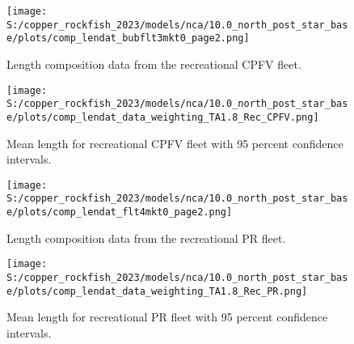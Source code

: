 \documentclass[11pt,
  letterpaper,
]{article}
\begin{document}
\pagebreak

\begin{figure}
{\centering
\texttt{[image: S:/copper\_rockfish\_2023/models/nca/10.0\_north\_post\_star\_base/plots/comp\_lendat\_bubflt3mkt0\_page2.png]}
}
\caption{Length composition data from the recreational CPFV fleet.\label{fig:rec-cpfv-len-data}}
\end{figure}

\pagebreak

\begin{figure}
{\centering
\texttt{[image: S:/copper\_rockfish\_2023/models/nca/10.0\_north\_post\_star\_base/plots/comp\_lendat\_data\_weighting\_TA1.8\_Rec\_CPFV.png]}
}
\caption{Mean length for recreational CPFV fleet with 95 percent confidence intervals.\label{fig:mean-rec-cpfv-len-data}}
\end{figure}

\pagebreak

\begin{figure}
{\centering
\texttt{[image: S:/copper\_rockfish\_2023/models/nca/10.0\_north\_post\_star\_base/plots/comp\_lendat\_flt4mkt0\_page2.png]}
}
\caption{Length composition data from the recreational PR fleet.\label{fig:rec-pr-len-data}}
\end{figure}

\pagebreak

\begin{figure}
{\centering
\texttt{[image: S:/copper\_rockfish\_2023/models/nca/10.0\_north\_post\_star\_base/plots/comp\_lendat\_data\_weighting\_TA1.8\_Rec\_PR.png]}
}
\caption{Mean length for recreational PR fleet with 95 percent confidence intervals.\label{fig:mean-rec-pr-len-data}}
\end{figure}

\FloatBarrier
\end{document}
